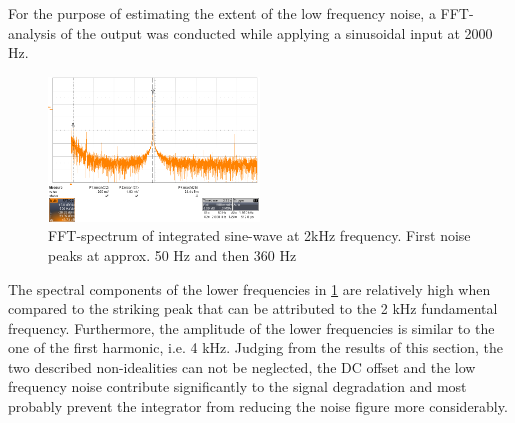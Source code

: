 For the purpose of estimating the extent of the low frequency noise, a FFT-analysis of the output was conducted while applying a sinusoidal input at 2000 Hz.

\begin{figure}[htbp]
 \centering
 \centerline{\includegraphics[width=0.5\textwidth]{figures/Results/Noisespectrum/sin2k-0_02v}}

  \caption[Kurze Abbildungsbeschreibung]{FFT-spectrum of integrated sine-wave at 2kHz frequency. First noise peaks at approx. 50 Hz and then 360 Hz}
\label{fig.noisefft}
\end{figure}

The spectral components of the lower frequencies in \ref{fig.noisefft} are relatively high when compared to the striking peak that can be attributed to the 2 kHz fundamental frequency.
Furthermore, the amplitude of the lower frequencies is similar to the one of the first harmonic, i.e. 4 kHz.
Judging from the results of this section, the two described non-idealities can not be neglected, the DC offset and the low frequency noise contribute significantly to the signal degradation and
most probably prevent the integrator from reducing the noise figure more considerably.




